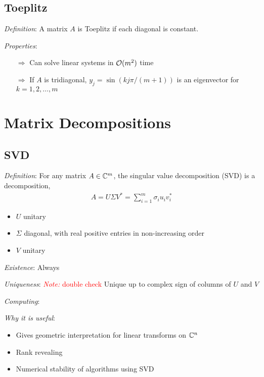 \documentclass[12pt]{article}
\newcommand{\note}[1]{\textcolor{red}{\textit{Note:} #1}}
\begin{document}
\subsection{Toeplitz}
\textit{Definition}: A matrix \( A \) is Toeplitz if each diagonal is constant.

\textit{Properties}:
\begin{itemize}[nolistsep]
    \item[\(\Rightarrow\)] Can solve linear systems in \( \mathcal{O}(m^2) \) time
    \item[\(\Rightarrow\)] If \( A \) is tridiagonal, \( y_j = \sin(k j \pi / (m+1)) \) is an eigenvector for \( k=1,2,\ldots, m \)
\end{itemize}



\pagebreak
\section{Matrix Decompositions}

\subsection{SVD}
\textit{Definition}: For any matrix \( A\in\mathbb{C}^m \), the singular value decomposition (SVD) is a decomposition,
\begin{align*}
    A = U\Sigma V^* = \sum_{i=1}^{m} \sigma_i u_iv_i^*
\end{align*}
\begin{itemize}[nolistsep]
    \item \( U \) unitary
    \item \( \Sigma \) diagonal, with real positive entries in non-increasing order
    \item \( V \) unitary
\end{itemize}

\textit{Existence}:
Always

\textit{Uniqueness}:
\note{double check}
Unique up to complex sign of columns of \( U \) and \( V \)

\textit{Computing}:

\textit{Why it is useful}:
\begin{itemize}[nolistsep]
    \item Gives geometric interpretation for linear transforms on \( \mathbb{C}^n \)
    \item Rank revealing
    \item Numerical stability of algorithms using SVD
\end{itemize}
\end{document}
